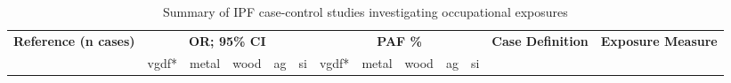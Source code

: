 \documentclass[a4paper,10pt]{article}
\begin{document}
\begin{table}[htbp]\centering
\caption{Summary of IPF case-control studies investigating occupational exposures}
\label{metatable1}

\tiny

    \begin{tabular}{|p{1.5cm}|p{0.5cm}p{0.5cm}p{0.5cm}p{0.5cm}p{0.5cm}|p{0.5cm}p{0.5cm}p{0.5cm}p{0.5cm}p{0.5cm}|p{2.5cm}|p{2cm}|}

\midrule

\textbf{Reference (n cases)} & \multicolumn{5}{c}{\textbf{OR; 95\% CI}} & \multicolumn{5}{c}{\textbf{PAF \%}} & \textbf{Case Definition} & \textbf{Exposure Measure} \\

        & vgdf* & metal & wood & ag & si & vgdf* & metal & wood & ag & si & & \\
\toprule



\end{tabular}
\end{table}
\end{document}
